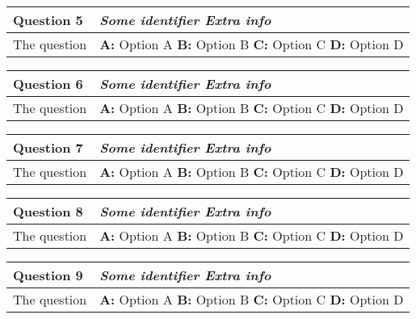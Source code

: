 \begin{tabular}{p{6cm}p{12.5cm}|} 
\textbf{Question 5} & \emph{Some identifier \hfill Extra info}  \\ \toprule  
The question & 
\textbf{A:} Option A \newline 
\textbf{B:} Option B \newline  
\textbf{C:} Option C \newline  
\textbf{D:} Option D \\ \bottomrule 
\end{tabular}


\begin{tabular}{p{6cm}p{12.5cm}|} 
\textbf{Question 6} & \emph{Some identifier \hfill Extra info}  \\ \toprule  
The question & 
\textbf{A:} Option A \newline 
\textbf{B:} Option B \newline  
\textbf{C:} Option C \newline  
\textbf{D:} Option D \\ \bottomrule 
\end{tabular}


\begin{tabular}{p{6cm}p{12.5cm}|} 
\textbf{Question 7} & \emph{Some identifier \hfill Extra info}  \\ \toprule  
The question & 
\textbf{A:} Option A \newline 
\textbf{B:} Option B \newline  
\textbf{C:} Option C \newline  
\textbf{D:} Option D \\ \bottomrule 
\end{tabular}


\begin{tabular}{p{6cm}p{12.5cm}|} 
\textbf{Question 8} & \emph{Some identifier \hfill Extra info}  \\ \toprule  
The question & 
\textbf{A:} Option A \newline 
\textbf{B:} Option B \newline  
\textbf{C:} Option C \newline  
\textbf{D:} Option D \\ \bottomrule 
\end{tabular}


\begin{tabular}{p{6cm}p{12.5cm}|} 
\textbf{Question 9} & \emph{Some identifier \hfill Extra info}  \\ \toprule  
The question & 
\textbf{A:} Option A \newline 
\textbf{B:} Option B \newline  
\textbf{C:} Option C \newline  
\textbf{D:} Option D \\ \bottomrule 
\end{tabular}


